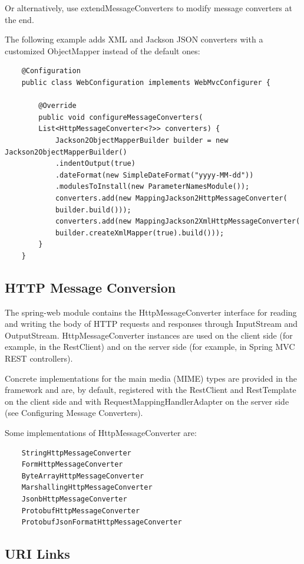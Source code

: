 \documentclass{scrartcl}
\begin{document}
Or alternatively, use extendMessageConverters to modify message converters at the end.

The following example adds XML and Jackson JSON converters with a customized ObjectMapper instead of the default ones:

\begin{lstlisting}
    @Configuration
    public class WebConfiguration implements WebMvcConfigurer {

        @Override
        public void configureMessageConverters(
        List<HttpMessageConverter<?>> converters) {
            Jackson2ObjectMapperBuilder builder = new Jackson2ObjectMapperBuilder()
            .indentOutput(true)
            .dateFormat(new SimpleDateFormat("yyyy-MM-dd"))
            .modulesToInstall(new ParameterNamesModule());
            converters.add(new MappingJackson2HttpMessageConverter(
            builder.build()));
            converters.add(new MappingJackson2XmlHttpMessageConverter(
            builder.createXmlMapper(true).build()));
        }
    }
\end{lstlisting}

\subsection{HTTP Message Conversion}

The spring-web module contains the HttpMessageConverter interface for reading and writing the body of HTTP requests and responses through InputStream and OutputStream. HttpMessageConverter instances are used on the client side (for example, in the RestClient) and on the server side (for example, in Spring MVC REST controllers).

Concrete implementations for the main media (MIME) types are provided in the framework and are, by default, registered with the RestClient and RestTemplate on the client side and with RequestMappingHandlerAdapter on the server side (see Configuring Message Converters).

Some implementations of HttpMessageConverter are:

    \begin{lstlisting}
    StringHttpMessageConverter
    FormHttpMessageConverter
    ByteArrayHttpMessageConverter
    MarshallingHttpMessageConverter
    JsonbHttpMessageConverter
    ProtobufHttpMessageConverter
    ProtobufJsonFormatHttpMessageConverter
    \end{lstlisting}

\subsection{URI Links}
\end{document}
